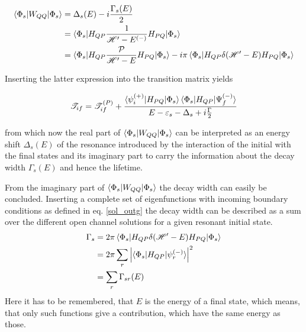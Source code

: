 \begin{align}
  \braket{\Phi_s|W_{QQ}|\Phi_s} & = \Delta_s(E) - i \frac{\Gamma_s(E)}{2}\\
                                & = \braket{\Phi_s|H_{QP}
                                    \frac{1}{\mathscr{H}' - E^{(-)}}H_{PQ}|\Phi_s}\\
                                & = \braket{\Phi_s|H_{QP}
                                    \frac{\mathcal{P}}{\mathscr{H}' - E}H_{PQ}|\Phi_s}
                                    - i\pi \braket{\Phi_s|H_{QP}\delta(\mathscr{H}'-E)H_{PQ}
                                    |\Phi_s} 
\end{align}

Inserting the latter expression into the transition matrix yields

\begin{equation}
  \mathscr{T}_{if} = \mathscr{T}_{if}^{(P)} + 
                     \frac{\braket{\psi_i^{(+)}|H_{PQ}|\Phi_s}
                           \braket{\Phi_s|H_{QP}|\Psi_f^{(-)}}}
                          {E-\varepsilon_s - \Delta_s + i \frac{\Gamma}{2}}
\end{equation}

from which now the real part of $\braket{\Phi_s|W_{QQ}|\Phi_s}$ can be interpreted 
as an energy shift $\Delta_s(E)$ of the resonance introduced by the interaction of the initial
with the final states and its imaginary part to carry the information about the
decay width $\Gamma_s(E)$ and hence the lifetime.


From the imaginary part of $\braket{\Phi_s|W_{QQ}|\Phi_s}$ the decay width can
easily be concluded. Inserting a complete set
of eigenfunctions with incoming boundary conditions as defined in
eq. \ref{sol_outg} the decay width can be described
as a sum over the different open channel solutions for a given resonant initial state.
\begin{align}
  \Gamma_s & = 2 \pi \braket{\Phi_s|H_{QP}\delta(\mathscr{H}'-E)H_{PQ}|\Phi_s}   \label{equation:Gamma_HE}\\
           & = 2 \pi \sum\limits_r \left | \braket{\Phi_s|H_{QP}|\psi_r^{(-)}} \right|^2
                 \label{equation:Gamma_HQP}\\
           & = \sum\limits_r \Gamma_{sr}(E)
\end{align}
Here it has to be remembered, that $E$ is the energy of a final state, which means, that
only such functions give a contribution, which have the same energy as those.

